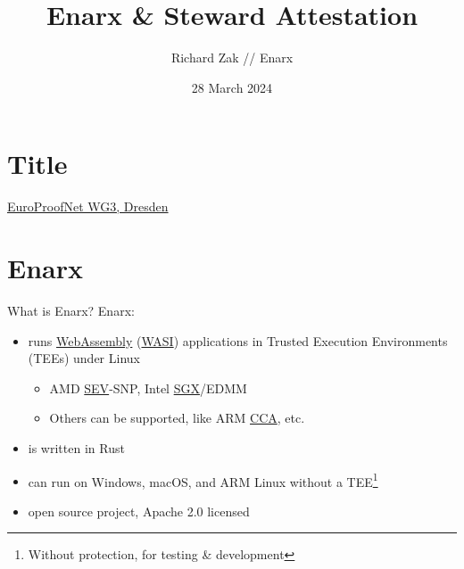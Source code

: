 \documentclass[graphics,compress]{beamer}
\title{Enarx \& Steward Attestation}
\author{Richard Zak // Enarx}
\date{28 March 2024}
\begin{document}
\section*{Title}
\begin{frame}
\maketitle
\centering
\href{https://europroofnet.github.io/wg3-dresden24/}{EuroProofNet WG3, Dresden}
\vspace{2.2cm}
\end{frame}

\frame{\tableofcontents}

\section{Enarx}
\begin{frame}{What is Enarx?}
        Enarx:
        \begin{itemize}
        \item runs \href{https://webassembly.org}{WebAssembly} (\href{https://wasi.dev}{WASI}) applications in Trusted Execution Environments (TEEs) under Linux
        \begin{itemize}
        \item AMD \href{https://www.amd.com/de/developer/sev.html}{SEV}-SNP, Intel \href{https://www.intel.com/content/www/us/en/products/docs/accelerator-engines/software-guard-extensions.html}{SGX}/EDMM
        \item Others can be supported, like ARM \href{https://www.arm.com/architecture/security-features/arm-confidential-compute-architecture}{CCA}, etc.
        \end{itemize}
        \item is written in Rust
        \item can run on Windows, macOS, and ARM Linux without a TEE\footnote{Without protection, for testing \& development}
        \item open source project, Apache 2.0 licensed
        \end{itemize}
\end{frame}
\end{document}
